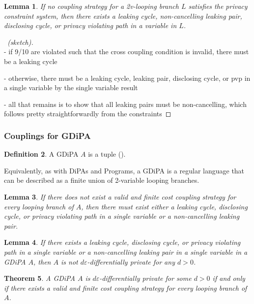 \documentclass[12pt]{article}
\newtheorem{thm}{Theorem}[section]
\newtheorem{lemma}[thm]{Lemma}
\theoremstyle{definition}
\newtheorem{defn}[thm]{Definition}
\begin{document}
\begin{lemma}
    If no coupling strategy for a 2v-looping branch $L$ satisfies the privacy constraint system, then there exists a leaking cycle, non-cancelling leaking pair, disclosing cycle, or privacy violating path in a variable in $L$.
\end{lemma}
\begin{proof}[\proofname~(sketch)]~\\
    - if 9/10 are violated such that the cross coupling condition is invalid, there must be a leaking cycle
    
    - otherwise, there must be a leaking cycle, leaking pair, disclosing cycle, or pvp in a single variable by the single variable result

    - all that remains is to show that all leaking pairs must be non-cancelling, which follows pretty straightforwardly from the constraints
\end{proof}

\subsubsection{Couplings for GDiPA}

\begin{defn}
    A GDiPA $A$ is a tuple ().

    Equivalently, as with DiPAs and Programs, a GDiPA is a regular language that can be described as a finite union of 2-variable looping branches. 
\end{defn}




\begin{lemma}
    If there does not exist a valid and finite cost coupling strategy for every looping branch of $A$, then there must exist either a leaking cycle, disclosing cycle, or privacy violating path in a single variable or a non-cancelling leaking pair. 
\end{lemma}

\begin{lemma}
    If there exists a leaking cycle, disclosing cycle, or privacy violating path in a single variable or a non-cancelling leaking pair in a single variable in a GDiPA $A$, then $A$ is not $d\varepsilon$-differentially private for any $d>0$. 
\end{lemma}

\begin{thm}
    A GDiPA $A$ is $d\varepsilon$-differentially private for some $d>0$ if and only if there exists a valid and finite cost coupling strategy for every looping branch of $A$. 
\end{thm}
\end{document}

